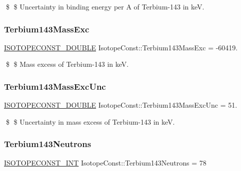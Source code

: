 \$ \$ Uncertainty in binding energy per A of Terbium-\/143 in keV. \mbox{\label{group___isotope_const-_terbium-_tb143_ga5f356f126a2cceb1d12525a8803f1d22}} 
\subsubsection{\texorpdfstring{Terbium143\+Mass\+Exc}{Terbium143MassExc}}
{\footnotesize\ttfamily \mbox{\hyperlink{group___isotope_const-_macros_ga8f45a7272ce02c0b4c65c44636ed719a}{I\+S\+O\+T\+O\+P\+E\+C\+O\+N\+S\+T\+\_\+\+D\+O\+U\+B\+LE}} Isotope\+Const\+::\+Terbium143\+Mass\+Exc = -\/60419.}

\$ \$ Mass excess of Terbium-\/143 in keV. \mbox{\label{group___isotope_const-_terbium-_tb143_ga6fb3ab9cdde519c2527571adc0c3db56}} 
\subsubsection{\texorpdfstring{Terbium143\+Mass\+Exc\+Unc}{Terbium143MassExcUnc}}
{\footnotesize\ttfamily \mbox{\hyperlink{group___isotope_const-_macros_ga8f45a7272ce02c0b4c65c44636ed719a}{I\+S\+O\+T\+O\+P\+E\+C\+O\+N\+S\+T\+\_\+\+D\+O\+U\+B\+LE}} Isotope\+Const\+::\+Terbium143\+Mass\+Exc\+Unc = 51.}

\$ \$ Uncertainty in mass excess of Terbium-\/143 in keV. \mbox{\label{group___isotope_const-_terbium-_tb143_gaabe11c841d8ff3991c0e244a3daa81ce}} 
\subsubsection{\texorpdfstring{Terbium143\+Neutrons}{Terbium143Neutrons}}
{\footnotesize\ttfamily \mbox{\hyperlink{group___isotope_const-_macros_ga5f18360b3e99483a35c32d789e62621c}{I\+S\+O\+T\+O\+P\+E\+C\+O\+N\+S\+T\+\_\+\+I\+NT}} Isotope\+Const\+::\+Terbium143\+Neutrons = 78}

